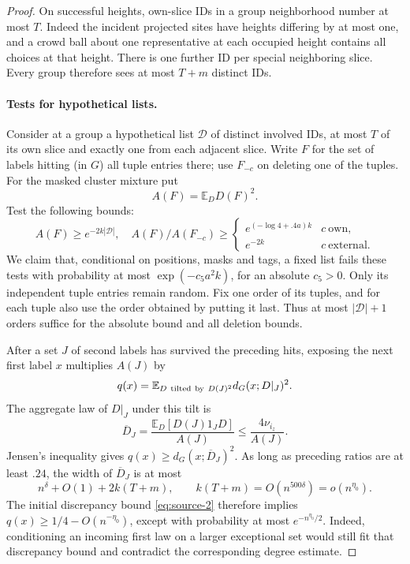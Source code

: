 \begin{proof}
On successful heights, own-slice IDs in a group neighborhood number at most \(T\). Indeed the incident projected sites have heights differing by at most one, and a crowd ball about one representative at each occupied height contains all choices at that height. There is one further ID per special neighboring slice. Every group therefore sees at most \(T+m\) distinct IDs.

\paragraph{Tests for hypothetical lists.}
Consider at a group a hypothetical list \(\mathcal D\) of distinct involved IDs, at most \(T\) of its own slice and exactly one from each adjacent slice. Write \(F\) for the set of labels hitting (in \(G\)) all tuple entries there; use \(F_{-c}\) on deleting one of the tuples. For the masked cluster mixture put
\[
 A(F)=\mathbb E_D D(F)^2 .
\]
Test the following bounds:
\begin{equation}
 A(F)\ge e^{-2k|\mathcal D|},\quad
 A(F)/A(F_{-c})\ge
 \begin{cases}e^{(-\log4+.4a)k}& c\ \text{own},\\e^{-2k}&c\ \text{external}.\end{cases}
 \label{eq:source-4}
\end{equation}
We claim that, conditional on positions, masks and tags, a fixed list fails these tests with probability at most \(\exp(-c_5a^2k)\), for an absolute \(c_5>0\). Only its independent tuple entries remain random. Fix one order of its tuples, and for each tuple also use the order obtained by putting it last. Thus at most \(|\mathcal D|+1\) orders suffice for the absolute bound and all deletion bounds.

After a set \(J\) of second labels has survived the preceding hits, exposing the next first label \(x\) multiplies \(A(J)\) by
\[
 q(x)=\mathbb E_{D\ {\rm tilted\ by}\ D(J)^2}
              d_G(x;D|_J)^2.
\]
The aggregate law of \(D|_J\) under this tilt is
\[
 \overline D_J=\frac{\mathbb E_D[D(J)1_JD]}{A(J)}
      \le\frac{4\nu_{i_z}}{A(J)}.
\]
Jensen's inequality gives \(q(x)\ge d_G(x;\overline D_J)^2\). As long as preceding ratios are at least \(.24\), the width of \(\overline D_J\) is at most
\[
 n^\delta+O(1)+2k(T+m),\qquad
 k(T+m)=O(n^{500\delta})=o(n^{\eta_0}).
\]
The initial discrepancy bound \eqref{eq:source-2} therefore implies
\(q(x)\ge1/4-O(n^{-\eta_0})\),
except with probability at most \(e^{-n^{\eta_0}/2}\). Indeed, conditioning an incoming first law on a larger exceptional set would still fit that discrepancy bound and contradict the corresponding degree estimate.


\end{proof}
